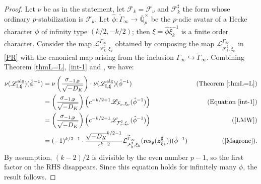 \documentclass[a4paper,11pt]{amsart}
\numberwithin{equation}{section}
\theoremstyle{plain}
\theoremstyle{definition}
\theoremstyle{remark}
\newcommand{\Q}{\mathbb Q}
\newcommand{\I}{\mathbb{I}}
\newcommand{\p}{\mathfrak{p}}
\begin{document}
\begin{proof} 
Let $\nu$ be as in the statement, let $\mathcal{F}_k=\mathcal{F}_{\nu}$ and $\mathcal{F}_k^\sharp$ the form whose ordinary $p$-stabilization is $\mathcal{F}_k$. 
Let $\hat\phi\colon \widetilde\Gamma_\infty\rightarrow\overline{\Q}_p^\times$ be the $p$-adic avatar of a Hecke character $\phi$ of infinity type $(k/2,-k/2)$; then $\xi=\hat\phi\hat\xi_k^{-1}$ is a finite order character. Consider the map $\mathcal{L}^{\widetilde\Gamma_\infty}_{\mathcal{F}_k^\sharp,\xi_k}$ obtained by composing the map
$\mathcal{L}^{\Gamma_\infty}_{\mathcal{F}_k^\sharp,\xi_k}$ in \eqref{PR} with the canonical map arising from the inclusion $\Gamma_\infty\hookrightarrow\widetilde{\Gamma}_\infty$.  
Combining Theorem \ref{thmL=L}, \eqref{int-1} and \cite[Theorem 7.2]{Magrone}, we have:
\begin{align*}
    \nu(\mathscr{L}_{\I,\boldsymbol{\xi}}^{\mathrm{alg}})(\hat\phi^{-1}) &= \nu \left(
\frac{\sigma_{-1,\p}}{\sqrt{-D_K}}\right)\cdot \nu(\mathscr{L}_{\I,\boldsymbol{\xi}}^{\mathrm{alg}})(\hat\phi^{-1}) &\text{ (Theorem \ref{thmL=L})}\\
&= \left(\frac{\sigma_{-1,\p}}{\sqrt{-D_K}}\right)
\left(c^{-k/2 +1} \mathscr{L}_{\mathcal{F}_\nu, \xi_\nu}(\hat\phi^{-1})\right) &\text{ (Equation \eqref{int-1})}\\
&= \left(\frac{\sigma_{-1,\p}}{\sqrt{-D_K}}\right)
\left(c^{-k/2 +1} \mathscr{L}_{\mathcal{F}_\nu^\sharp, \xi_\nu}(\hat\phi^{-1})\right) &\text{ (\cite[Lemma 6.1]{LMW})}\\
&= (-1)^{k/2-1}\cdot
\frac{ \sqrt{-D_K}^{k/2-1}}{c^{k-2}}
\mathcal{L}^{\widetilde\Gamma_\infty}_{\mathcal{F}_k^\sharp,\xi_k}(\mathrm{res}_\p(\boldsymbol{z}_{\xi_k}^\sharp))(\hat\phi^{-1})&\text{ (\cite[Theorem 7.2]{Magrone}).}
\end{align*}
 By assumption, $(k-2)/2$ is divisible by the even number $p-1$, so the first factor on the RHS disappears. 
Since this equation holds for infinitely many $\phi$, the result follows.
\end{proof}

 


\end{document}

